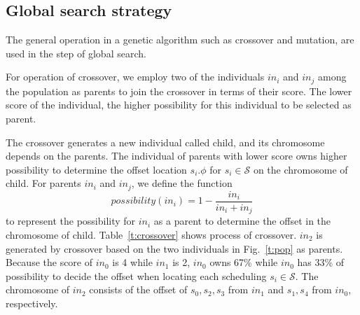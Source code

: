 \documentclass[10pt,journal]{IEEEtran}
\newcommand{\calS}{\mathcal{S}}
\theoremstyle{remark}
\begin{document}
\subsection{Global search strategy \label{s:glo}}

The general operation in a genetic algorithm such as crossover and mutation,
  are used in the step of global search. 

For operation of crossover,
 we employ two of the individuals $in_i$ and $in_j$ among the population as parents to join the crossover in terms of their score.
The lower score of the individual,
 the higher possibility for this individual to be selected as parent.
 
The crossover generates a new individual called child, and its chromosome depends on the parents.
The individual of parents with lower score owns higher possibility to determine the offset location $s_i.\phi$ for $s_i\in\calS$ on the chromosome of child.
For parents $in_i$ and $in_j$, we define the function
\begin{equation}
	possibility(in_i)=1-\frac{in_i}{in_i+in_j}
\end{equation}
to represent the possibility for $in_i$ as a parent to determine the offset in the chromosome of child.
Table~\ref{t:crossover} shows process of crossover.
$in_2$ is generated by crossover based on the two individuals in Fig.~\ref{t:pop} as parents.
Because the score of $in_0$ is 4 while $in_1$ is 2,
 $in_0$ owns 67\% while $in_0 $ has 33\% of possibility to decide the offset when locating each scheduling $s_i\in\calS$.
The chromosome of $in_2$ consists of the offset of $s_0,s_2,s_3$ from $in_1$ and $s_1,s_4$ from $in_0$, respectively.
\end{document}
